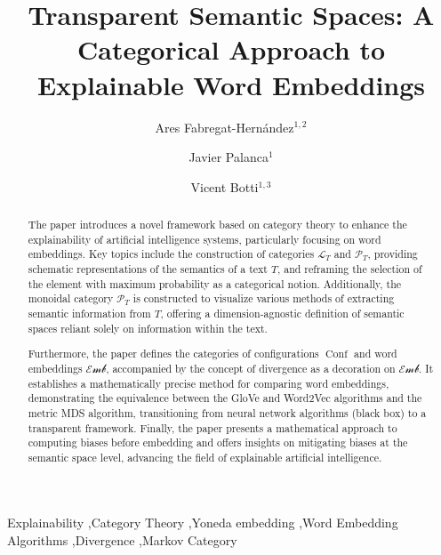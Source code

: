 \documentclass[10pt,a4paper]{elsarticle}
\title{Transparent Semantic Spaces: A Categorical Approach to Explainable Word Embeddings}
\renewcommand{\L}{\mathcal{L}}
\renewcommand{\P}{\mathcal{P}}
\newcommand{\Emb}{\mathcal{Emb}}
\newcommand{\Conf}{\operatorname{Conf}}
\begin{document}
\begin{frontmatter}

\author{Ares Fabregat-Hernández$^{1,2}$}

\author{Javier Palanca$^{1}$}
\author{Vicent Botti$^{1,3}$}
\address{$^{1}$ Valencian Research Institute for Artificial Intelligence (VRAIN)\\ Universitat Politècnica de València, \\
	Camí de Vera s/n, 46022, Valencia,  Spain}
\address{$ ^{2} $Universidad Internacional de Valencia (VIU), C/Pintor Sorolla 21, 46002 Valencia, Spain}
\address{$^{3}$ valgrAI (Valencian Graduate School and Research Network of Artificial Intelligence)}



\begin{abstract}
	The paper introduces a novel framework based on category theory to enhance the explainability of artificial intelligence systems, particularly focusing on word embeddings. Key topics include the construction of categories $ \L_{T} $ and $ \P_{T} $, providing schematic representations of the semantics of a text $ T $, and reframing the selection of the element with maximum probability as a categorical notion. Additionally, the monoidal category $ \P_{T} $ is constructed to visualize various methods of extracting semantic information from $ T $, offering a dimension-agnostic definition of semantic spaces reliant solely on information within the text.
	
	Furthermore, the paper defines the categories of configurations $ \Conf $ and word embeddings $ \Emb $, accompanied by the concept of divergence as a decoration on $ \Emb $. It establishes a mathematically precise method for comparing word embeddings, demonstrating the equivalence between the GloVe and Word2Vec algorithms and the metric MDS algorithm, transitioning from neural network algorithms (black box) to a transparent framework. Finally, the paper presents a mathematical approach to computing biases before embedding and offers insights on mitigating biases at the semantic space level, advancing the field of explainable artificial intelligence.
	
	
	
	
\end{abstract}

\begin{keyword}
		Explainability \sep Category Theory  \sep Yoneda embedding \sep Word Embedding Algorithms \sep Divergence \sep Markov Category
\end{keyword}

\end{frontmatter}
\end{document}
